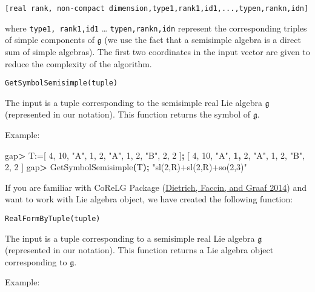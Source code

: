 \documentclass[
]{article}
\newenvironment{Shaded}{\begin{snugshade}}{\end{snugshade}}
\newcommand{\BuiltInTok}[1]{#1}
\newcommand{\ErrorTok}[1]{\textcolor[rgb]{0.64,0.00,0.00}{\textbf{#1}}}
\newcommand{\ExtensionTok}[1]{#1}
\newcommand{\KeywordTok}[1]{\textcolor[rgb]{0.13,0.29,0.53}{\textbf{#1}}}
\newcommand{\NormalTok}[1]{#1}
\newcommand{\OperatorTok}[1]{\textcolor[rgb]{0.81,0.36,0.00}{\textbf{#1}}}
\newcommand{\StringTok}[1]{\textcolor[rgb]{0.31,0.60,0.02}{#1}}
\begin{document}
\begin{verbatim}
[real rank, non-compact dimension,type1,rank1,id1,...,typen,rankn,idn]
\end{verbatim}

where \texttt{type1,\ rank1,id1} \ldots{} \texttt{typen,rankn,idn}
represent the corresponding triples of simple components of
\(\mathfrak{g}\) (we use the fact that a semisimple algebra is a direct
sum of simple algebras). The first two coordinates in the input vector
are given to reduce the complexity of the algorithm.

\begin{verbatim}
GetSymbolSemisimple(tuple)
\end{verbatim}

The input is a tuple corresponding to the semisimple real Lie algebra
\(\mathfrak{g}\) (represented in our notation). This function returns
the symbol of \(\mathfrak{g}\).

Example:

\begin{Shaded}
\begin{Highlighting}[]
\ExtensionTok{gap}\OperatorTok{\textgreater{}}\NormalTok{ T:=[ 4, 10, }\StringTok{"A"}\NormalTok{, 1, 2, }\StringTok{"A"}\NormalTok{, 1, 2, }\StringTok{"B"}\NormalTok{, 2, 2 ]}\KeywordTok{;}
\BuiltInTok{[}\NormalTok{ 4, 10, }\StringTok{"A"}\NormalTok{, }\ErrorTok{1,}\NormalTok{ 2, }\StringTok{"A"}\NormalTok{, 1, 2, }\StringTok{"B"}\NormalTok{, 2, 2 ]}
\ExtensionTok{gap}\OperatorTok{\textgreater{}}\NormalTok{ GetSymbolSemisimple}\ErrorTok{(}\ExtensionTok{T}\KeywordTok{);}
\StringTok{"sl(2,R)+sl(2,R)+so(2,3)"}
\end{Highlighting}
\end{Shaded}

If you are familiar with CoReLG Package
(\protect\hyperlink{ref-CoReLG}{Dietrich, Faccin, and Graaf 2014}) and
want to work with Lie algebra object, we have created the following
function:

\begin{verbatim}
RealFormByTuple(tuple)
\end{verbatim}

The input is a tuple corresponding to a semisimple real Lie algebra
\(\mathfrak{g}\) (represented in our notation). This function returns a
Lie algebra object corresponding to \(\mathfrak{g}\).

Example:
\end{document}
